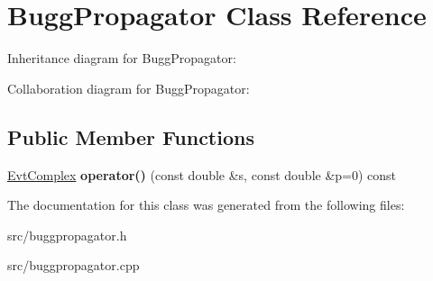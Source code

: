 \hypertarget{class_bugg_propagator}{}\section{Bugg\+Propagator Class Reference}
\label{class_bugg_propagator}


Inheritance diagram for Bugg\+Propagator\+:


Collaboration diagram for Bugg\+Propagator\+:
\subsection*{Public Member Functions}
\begin{DoxyCompactItemize}
\item 
\hypertarget{class_bugg_propagator_ae04158fafd9c73b58e5129d7d9ad156e}{}\hyperlink{class_evt_complex}{Evt\+Complex} {\bfseries operator()} (const double \&s, const double \&p=0) const \label{class_bugg_propagator_ae04158fafd9c73b58e5129d7d9ad156e}

\end{DoxyCompactItemize}


The documentation for this class was generated from the following files\+:\begin{DoxyCompactItemize}
\item 
src/buggpropagator.\+h\item 
src/buggpropagator.\+cpp\end{DoxyCompactItemize}
